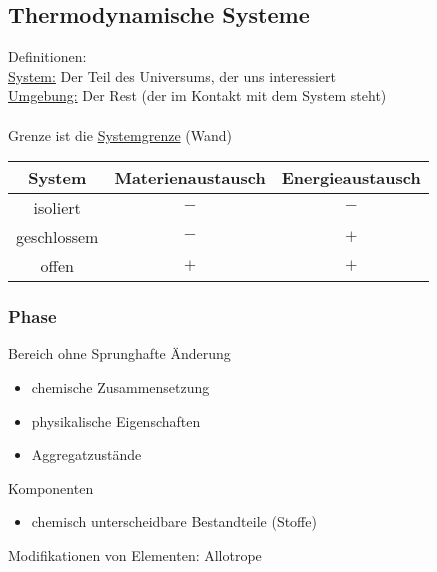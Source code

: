 \documentclass[a4paper, fleqn]{article}
\begin{document}
\subsection{Thermodynamische Systeme}
Definitionen:\\
\underline{System:} \hspace*{1.55cm} Der Teil des Universums, der uns interessiert\\
\underline{Umgebung:} \hspace*{1cm} Der Rest \hspace*{0.5cm} (der im Kontakt mit dem System steht)\\
\\
Grenze ist die \underline{Systemgrenze} \hspace*{0.5cm} (Wand)
\begin{center}
    \begin{tabular}{c c c} 
     \hline
     System & Materienaustausch & Energieaustausch \\ 
     \hline
     isoliert & $-$ & $-$ \\ 
     geschlossem & $-$ & $+$ \\ 
     offen & $+$ & $+$\\
     \hline
    \end{tabular}
    \end{center}
\subsubsection{Phase}
Bereich ohne Sprunghafte Änderung
\begin{itemize}
    \item chemische Zusammensetzung
    \item physikalische Eigenschaften
    \item Aggregatzustände
\end{itemize}
Komponenten
\begin{itemize}
    \item chemisch unterscheidbare Bestandteile (Stoffe)
\end{itemize}
Modifikationen von Elementen: Allotrope
\end{document}
